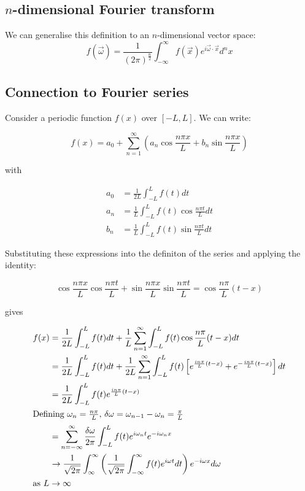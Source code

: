 \documentclass{../../physics_notes}
\begin{document}
\subsection{$n$-dimensional Fourier transform}

We can generalise this definition to an $n$-dimensional vector space:
\begin{equation}
\hat{f}(\vec{\omega}) = \frac{1}{(2\pi)^{\frac{n}{2}}} \int_{-\infty}^\infty f(\vec{x}) e^{i\vec{\omega}\cdot\vec{x}} d^n x
\end{equation}


\subsection{Connection to Fourier series}

Consider a periodic function $f(x)$ over $[-L,L]$. We can write:

\begin{equation}
f(x) = a_0 + \sum_{n=1}^\infty \left(a_n \cos{\frac{n\pi x}{L}} + b_n \sin{\frac{n\pi x}{L}}\right)
\end{equation}

with 

\begin{align*}
a_0 &= \frac{1}{2L}\int_{-L}^{L} f(t) dt \\
a_n &= \frac{1}{L}\int_{-L}^{L} f(t) \cos{\frac{n\pi t}{L}} dt \\
b_n &= \frac{1}{L}\int_{-L}^{L} f(t) \sin{\frac{n\pi t}{L}} dt
\end{align*}

Substituting these expressions into the definiton of the series and applying the identity:

\begin{equation*}
\cos{\frac{n\pi x}{L}}\cos{\frac{n\pi t}{L}} + \sin{\frac{n\pi x}{L}}\sin{\frac{n\pi t}{L}} = \cos{\frac{n\pi}{L}(t-x)}
\end{equation*}

gives

\begin{align*}
f(x) &= \frac{1}{2L}\int_{-L}^{L} f(t)dt + \frac{1}{L}\sum_{n=1}^\infty \int_{-L}^L f(t) \cos{\frac{n\pi}{L}(t-x)} dt \\
&= \frac{1}{2L}\int_{-L}^{L} f(t)dt + \frac{1}{2L}\sum_{n=1}^\infty \int_{-L}^L f(t) \left[ e^{\frac{in\pi}{L}(t-x)} + e^{-\frac{in\pi}{L}(t-x)} \right] dt \\
&= \frac{1}{2L}\int_{-L}^L f(t) e^{\frac{in\pi}{L}(t-x)} \\
\intertext{Defining $\omega_n = \frac{n\pi}{L}$, $\delta\omega = \omega_{n-1} - \omega_n = \frac{\pi}{L}$}
&=\sum_{n=-\infty}^{\infty} \frac{\delta\omega}{2\pi} \int_{-L}^L f(t) e^{i\omega_n t} e^{-i\omega_n x} \\
&\to \frac{1}{\sqrt{2\pi}}\int_{\infty}^\infty \left(\frac{1}{\sqrt{2\pi}} \int_{-\infty}^\infty f(t) e^{i\omega t}dt\right) e^{-i\omega x} d\omega \\
\intertext{as $L\to\infty$}
\end{align*}
\end{document}

